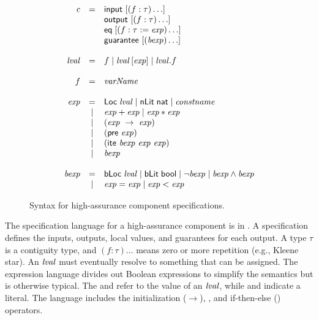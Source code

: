 \begin{figure}
  \[
    \begin{array}{rcl}
      \mathit{c}    & = & \konst{input}\ [(f : \tau)\ldots] \\
                    &   & \konst{output}\ [(f : \tau)\ldots] \\
                    &   & \konst{eq}\; [(f : \tau := \mathit{exp})\ldots] \\
                    &   & \konst{guarantee}\ [(\mathit{bexp})\ldots]\\\\
      
      \lval         & = & f \mid \lval \, [ \mathit{exp} ]
                          \mid \lval . f \\ \\

      f             & = & \mathit{varName} \\ \\

      \mathit{exp}  & = & \konst{Loc}\; \lval
                          \mid \konst{nLit}\; \konst{nat}
                          \mid \mathit{constname} \\
                    & | & \mathit{exp} + \mathit{exp}
                          \mid \mathit{exp} * \mathit{exp} \\
                    & | & (\mathit{exp}\ \rightarrow\ \mathit{exp}) \\
                    & | & (\konst{pre}\ \mathit{exp}) \\
                    & | & (\konst{ite}\ \mathit{bexp}\ \mathit{exp}\ \mathit{exp})\\
                    & | & \mathit{bexp} \\ \\
                          
      \mathit{bexp} & = & \konst{bLoc}\; \lval
                          \mid  \konst{bLit}\; \konst{bool}
                          \mid  \neg \mathit{bexp}
                          \mid  \mathit{bexp} \land \mathit{bexp} \\
                    & | & \mathit{exp} = \mathit{exp} 
                    \mid  \mathit{exp} < \mathit{exp}
\end{array}
\]
\caption{Syntax for high-assurance component specifications.}
\label{fig:syntax}
\end{figure}

The specification language for a high-assurance component is in . 
A specification defines the inputs, outputs, local values, and guarantees for each output. 
A type $\tau$ is a contiguity type, and $(f : \tau)\ldots$ means zero or more repetition (e.g., Kleene star). 
An $\mathit{lval}$ must eventually resolve to something that can be assigned. 
The expression language divides out Boolean expressions to simplify the semantics but is otherwise typical. 
The  and  refer to the value of an $\mathit{lval}$, while  and  indicate a literal. 
The language includes the initialization ($\rightarrow$), , and if-then-else () operators.


